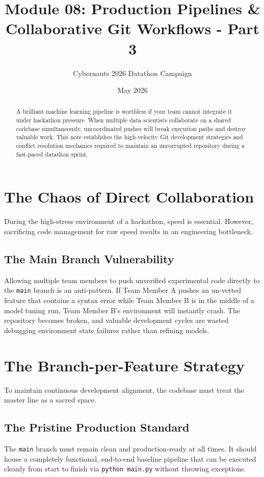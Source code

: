 \documentclass{article}
\title{Module 08: Production Pipelines \& Collaborative Git Workflows - Part 3}
\author{Cybernauts 2026 Datathon Campaign}
\date{May 2026}
\begin{document}
\maketitle

\begin{abstract}
A brilliant machine learning pipeline is worthless if your team cannot integrate it under hackathon pressure. When multiple data scientists collaborate on a shared codebase simultaneously, uncoordinated pushes will break execution paths and destroy valuable work. This note establishes the high-velocity Git development strategies and conflict resolution mechanics required to maintain an uncorrupted repository during a fast-paced datathon sprint.
\end{abstract}

\tableofcontents
\newpage

\section{The Chaos of Direct Collaboration}
During the high-stress environment of a hackathon, speed is essential. However, sacrificing code management for raw speed results in an engineering bottleneck.

\subsection{The Main Branch Vulnerability}
Allowing multiple team members to push unverified experimental code directly to the \texttt{main} branch is an anti-pattern. If Team Member A pushes an un-vetted feature that contains a syntax error while Team Member B is in the middle of a model tuning run, Team Member B's environment will instantly crash. The repository becomes broken, and valuable development cycles are wasted debugging environment state failures rather than refining models.

\section{The Branch-per-Feature Strategy}
To maintain continuous development alignment, the codebase must treat the master line as a sacred space.

\subsection{The Pristine Production Standard}
The \texttt{main} branch must remain clean and production-ready at all times. It should house a completely functional, end-to-end baseline pipeline that can be executed cleanly from start to finish via \texttt{python main.py} without throwing exceptions.
\end{document}

